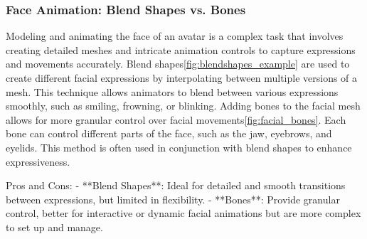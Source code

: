 \documentclass[../../main.tex]{subfiles}
\begin{document}
\subsubsection{Face Animation: Blend Shapes vs. Bones}

Modeling and animating the face of an avatar is a complex task that involves creating detailed meshes and intricate animation controls to capture expressions and movements accurately. Blend shapes\ref{fig:blendshapes_example} are used to create different facial expressions by interpolating between multiple versions of a mesh. This technique allows animators to blend between various expressions smoothly, such as smiling, frowning, or blinking. Adding bones to the facial mesh allows for more granular control over facial movements\ref{fig:facial_bones}. Each bone can control different parts of the face, such as the jaw, eyebrows, and eyelids. This method is often used in conjunction with blend shapes to enhance expressiveness.

Pros and Cons:
- **Blend Shapes**: Ideal for detailed and smooth transitions between expressions, but limited in flexibility.
- **Bones**: Provide granular control, better for interactive or dynamic facial animations but are more complex to set up and manage.
\end{document}
